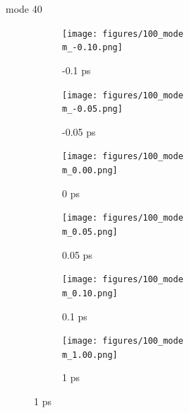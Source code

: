 \documentclass{beamer}
\newcommand\w{0.32}
\begin{document}
\renewcommand\m{40}
\begin{frame}{mode \m}
	\begin{figure}
		\centering
		\begin{subfigure}[b]{\w\textwidth}
			\centering
			\texttt{[image: figures/100\_mode\\m\_-0.10.png]}
			\caption{-0.1 ps}
		\end{subfigure}
		\begin{subfigure}[b]{\w\textwidth}
			\centering
			\texttt{[image: figures/100\_mode\\m\_-0.05.png]}
			\caption{-0.05 ps}
		\end{subfigure}
		\begin{subfigure}[b]{\w\textwidth}
			\centering
			\texttt{[image: figures/100\_mode\\m\_0.00.png]}
			\caption{0 ps}
		\end{subfigure}
		\begin{subfigure}[b]{\w\textwidth}
			\centering
			\texttt{[image: figures/100\_mode\\m\_0.05.png]}
			\caption{0.05 ps}
		\end{subfigure}
		\begin{subfigure}[b]{\w\textwidth}
			\centering
			\texttt{[image: figures/100\_mode\\m\_0.10.png]}
			\caption{0.1 ps}
		\end{subfigure}
		\begin{subfigure}[b]{\w\textwidth}
			\centering
			\texttt{[image: figures/100\_mode\\m\_1.00.png]}
			\caption{1 ps}
		\end{subfigure}
	\end{figure}
\end{frame}
\end{document}

